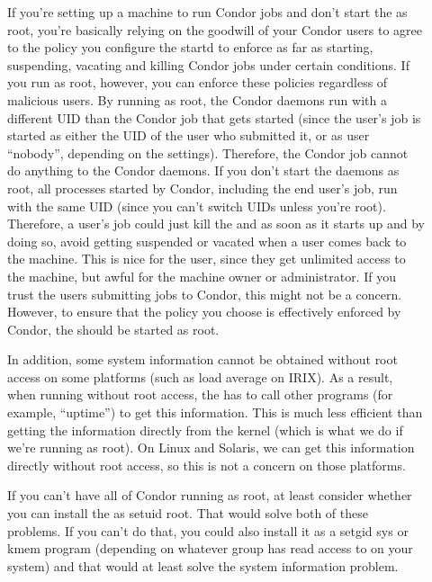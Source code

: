 \begin{description}

\item[] If you're setting up a machine to run Condor
   jobs and don't start the  as root, you're basically
   relying on the goodwill of your Condor users to agree to the policy
   you configure the startd to enforce as far as starting, suspending,
   vacating and killing Condor jobs under certain conditions.  If you
   run as root, however, you can enforce these policies regardless of
   malicious users.  By running as root, the Condor daemons run with a
   different UID than the Condor job that gets started (since the
   user's job is started as either the UID of the user who submitted
   it, or as user ``nobody'', depending on the 
   settings).  Therefore, the Condor job cannot do anything to the
   Condor daemons.  If you don't start the daemons as root, all
   processes started by Condor, including the end user's job, run with
   the same UID (since you can't switch UIDs unless you're root).
   Therefore, a user's job could just kill the  and
    as soon as it starts up and by doing so, avoid
   getting suspended or vacated when a user comes back to the machine.
   This is nice for the user, since they get unlimited access to the
   machine, but awful for the machine owner or administrator.  If you
   trust the users submitting jobs to Condor, this might not be a
   concern.  However, to ensure that the policy you choose is
   effectively enforced by Condor, the  should be
   started as root.

   In addition, some system information cannot be obtained without
   root access on some platforms (such as load average on IRIX).  As a
   result, when running without root access, the  has to
   call other programs (for example, ``uptime'') to get this
   information.  This is much less efficient than getting the
   information directly from the kernel (which is what we do if we're
   running as root).  On Linux and Solaris, we can get this
   information directly without root access, so this is not a concern
   on those platforms.

   If you can't have all of Condor running as root, at least consider
   whether you can install the  as setuid root.  That
   would solve both of these problems.  If you can't do that, you
   could also install it as a setgid sys or kmem program (depending on
   whatever group has read access to  on your system)
   and that would at least solve the system information problem.


\end{description}
